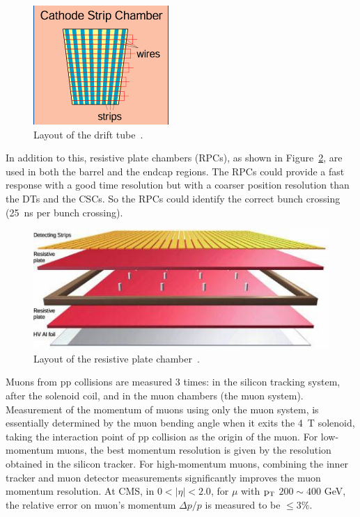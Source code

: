 \begin{figure}[!htbp]
\centering
\includegraphics[width=.9\textwidth]{figures/CSC.png}
\caption{Layout of the drift tube~\cite{web:CSC}.}
\label{fig:CSC}
\end{figure} 


In addition to this, resistive plate chambers (RPCs), as shown in Figure~\ref{fig:RPC}, are used in both the barrel and the endcap regions. The RPCs could provide a fast response with a good time resolution but with a coarser position resolution than the DTs and the CSCs.  So the RPCs could identify the correct bunch crossing (25~ns per bunch crossing). 

\begin{figure}[!htbp]
\centering
\includegraphics[width=.9\textwidth]{figures/RPC.jpg}
\caption{Layout of the resistive plate chamber~\cite{web:CSC}.}
\label{fig:RPC}
\end{figure}

Muons from pp collisions are measured 3 times: in the silicon tracking system, after the solenoid coil, and in the muon chambers (the muon system). 
Measurement of the momentum of muons using only the muon system, is essentially determined by the muon bending angle when it exits  the 4~T solenoid, taking the interaction point of pp collision as the origin of the muon.
For low-momentum muons, the best momentum resolution is given by the resolution 
obtained in the silicon tracker. For high-momentum muons, combining the inner tracker and muon detector measurements significantly improves the muon momentum resolution.  
At CMS, in $0 < |\eta| < 2.0 $, for $\mu$ with $\mathrm{p_{T}}$ $200{\sim}400$ GeV,
the relative error on muon's momentum $\Delta p / p$ is measured to be $\leq 3\%$.


